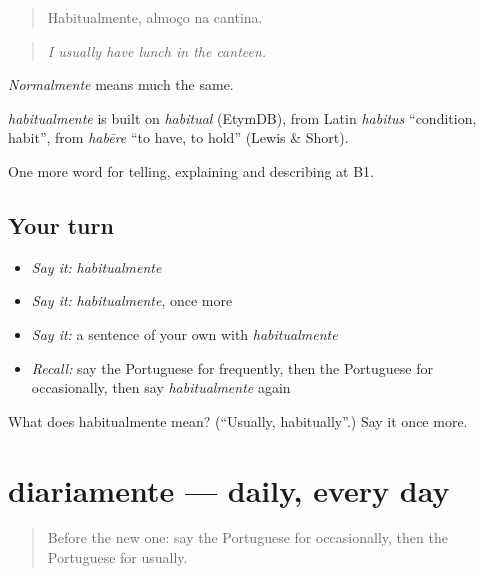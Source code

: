 \begin{quote}
Habitualmente, almoço na cantina.
\end{quote}

\begin{quote}
\emph{I usually have lunch in the canteen.}
\end{quote}

\emph{Normalmente} means much the same.

\begin{cousinweb}
\emph{habitualmente} is built on \emph{habitual} (EtymDB), from Latin \emph{habitus} \textquotedblleft{}condition, habit\textquotedblright{}, from \emph{habēre} \textquotedblleft{}to have, to hold\textquotedblright{} (Lewis \& Short).
\end{cousinweb}

\begin{grammarlens}[title={What you've built}]
One more word for telling, explaining and describing at B1.
\end{grammarlens}

\subsection*{Your turn}
\begin{itemize}
\raggedright
  \item \emph{Say it:} \emph{habitualmente}
  \item \emph{Say it:} \emph{habitualmente}, once more
  \item \emph{Say it:} a sentence of your own with \emph{habitualmente}
  \item \emph{Recall:} say the Portuguese for frequently, then the Portuguese for occasionally, then say \emph{habitualmente} again
\end{itemize}

\begin{tcolorbox}[breakable,colback=teal!4,colframe=teal!35!black,title={Before you move on}]
What does habitualmente mean? (\textquotedblleft{}Usually, habitually\textquotedblright{}.) Say it once more.
\end{tcolorbox}
\section[diariamente]{diariamente — daily, every day}

\label{lesson:PT-C277-diariamente}



\begin{quote}
Before the new one: say the Portuguese for occasionally, then the Portuguese for usually.
\end{quote}

